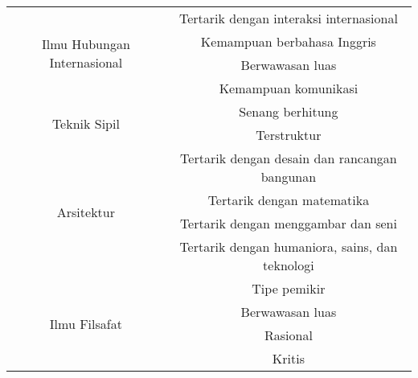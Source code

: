 \begin{table}[H]
\begin{tabular}{| c | c |}
		\hline
		\multirow{4}{10em}{Ilmu Hubungan Internasional} & Tertarik dengan interaksi internasional \\
		& Kemampuan berbahasa Inggris \\
		& Berwawasan luas \\
		& Kemampuan komunikasi\\
		
		\hline
		\multirow{2}{10em}{Teknik Sipil} & Senang berhitung \\
		& Terstruktur \\
		
		\hline
		\multirow{4}{10em}{Arsitektur} & Tertarik dengan desain dan rancangan bangunan \\
		& Tertarik dengan matematika \\
		& Tertarik dengan menggambar dan seni\\
		& Tertarik dengan humaniora, sains, dan teknologi \\
		
		\hline
		\multirow{4}{10em}{Ilmu Filsafat} & Tipe pemikir \\
		& Berwawasan luas \\
		& Rasional \\
		& Kritis \\
		
		\hline
	\end{tabular} 
\end{table}

